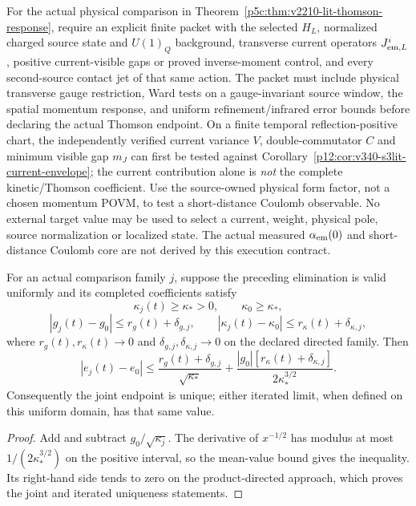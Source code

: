\documentclass[12pt,a4paper]{article}
\begin{document}
\begin{remark}
\label{p5c:rem:v340-s3lit-thomson-packet}
For the actual physical comparison in
Theorem~\ref{p5c:thm:v2210-lit-thomson-response}, require an
explicit finite packet with the selected $H_L$, normalized charged
source state and $U(1)_Q$ background, transverse current operators
$J^i_{{\rm em},L}$, positive current-visible gaps or proved
inverse-moment control, and every second-source contact jet of
that same action.  The packet must include physical transverse
gauge restriction, Ward tests on a gauge-invariant source window,
the spatial momentum response, and uniform refinement/infrared
error bounds before declaring the actual Thomson endpoint.
On a finite temporal reflection-positive chart, the independently
verified current variance $V$, double-commutator $C$ and minimum
visible gap $m_J$ can first be tested against
Corollary~\ref{p12:cor:v340-s3lit-current-envelope}; the current
contribution alone is \emph{not} the complete kinetic/Thomson
coefficient.  Use the source-owned physical form factor, not a
chosen momentum POVM, to test a short-distance Coulomb observable.
No external target value may be used to select a current, weight,
physical pole, source normalization or localized state.  The actual
measured $\alpha_{\rm em}(0)$ and short-distance Coulomb core are
not derived by this execution contract.
\end{remark}


\begin{proposition}
\label{p5c:prop:v2210-lit-thomson-uniform}
For an actual comparison family \(j\), suppose the preceding elimination
is valid uniformly and its completed coefficients satisfy
\[
 \kappa_j(t)\ge\kappa_*>0,\qquad\kappa_0\ge\kappa_*,
\]
\[
 |g_j(t)-g_0|\le r_g(t)+\delta_{g,j},\qquad
 |\kappa_j(t)-\kappa_0|\le r_\kappa(t)+\delta_{\kappa,j},
\]
where \(r_g(t),r_\kappa(t)\to0\) and
\(\delta_{g,j},\delta_{\kappa,j}\to0\) on the declared directed family.
Then
\[
 \boxed{|e_j(t)-e_0|
 \le\frac{r_g(t)+\delta_{g,j}}{\sqrt{\kappa_*}}
 +\frac{|g_0|[r_\kappa(t)+\delta_{\kappa,j}]}{2\kappa_*^{3/2}}.}
\]
Consequently the joint endpoint is unique; either iterated limit, when
defined on this uniform domain, has that same value.
\end{proposition}
\begin{proof}
Add and subtract \(g_0/\sqrt{\kappa_j}\).  The derivative of
\(x^{-1/2}\) has modulus at most \(1/(2\kappa_*^{3/2})\) on the positive
interval, so the mean-value bound gives the inequality.  Its right-hand
side tends to zero on the product-directed approach, which proves the
joint and iterated uniqueness statements.
\end{proof}
\end{document}
